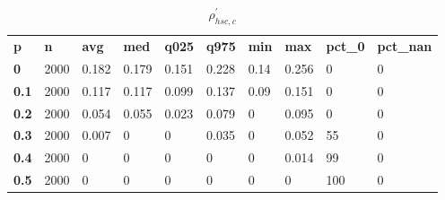 \begin{table}[h]
 \centering 
\footnotesize
\caption{$\rho_{hsc,c}^\prime $}
\label{tab:alphahscc}
\begin{tabular}[h]{| l l l l l l l l l l|
    } \hline
\textbf{ p} & \textbf{ n} & \textbf{ avg} & \textbf{ med} & \textbf{ q025} & \textbf{ q975} & \textbf{ min} & \textbf{ max} & \textbf{ pct\_0} & \textbf{ pct\_nan}
           \\
  \textbf{  0} & 2000 & 0.182 & 0.179 & 0.151 & 0.228 & 0.14 & 0.256 &   0 & 0
           \\
  \textbf{0.1} & 2000 & 0.117 & 0.117 & 0.099 & 0.137 & 0.09 & 0.151 &   0 & 0
           \\
  \textbf{0.2} & 2000 & 0.054 & 0.055 & 0.023 & 0.079 &    0 & 0.095 &   0 & 0
           \\
  \textbf{0.3} & 2000 & 0.007 &     0 &     0 & 0.035 &    0 & 0.052 &  55 & 0
           \\
  \textbf{0.4} & 2000 &     0 &     0 &     0 &     0 &    0 & 0.014 &  99 & 0
           \\
  \textbf{0.5} & 2000 &     0 &     0 &     0 &     0 &    0 &     0 & 100 & 0
           \\
 \hline \end{tabular}
 \end{table}
